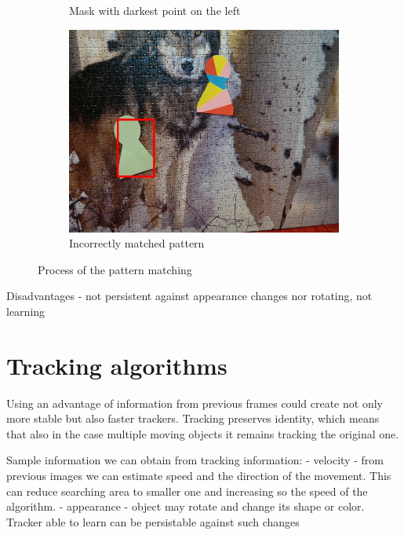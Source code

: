 \begin{figure}
\begin{subfigure}{0.48\linewidth}
    \caption{Mask with darkest point on the left}
  \end{subfigure}
  \begin{subfigure}{0.48\linewidth}
    \includegraphics[width=\linewidth]{img/pattern_matching/result-incorrect.jpg}
    \caption{Incorrectly matched pattern}
  \end{subfigure}
  \caption{Process of the pattern matching}
  \label{fig:pattern-matching-tracker}
\end{figure}


Disadvantages
- not persistent against appearance changes nor rotating, not learning


\section{Tracking algorithms}

Using an advantage of information from previous frames could create not only
more stable but also faster trackers. Tracking preserves identity, which means
that also in the case multiple moving objects it remains tracking the original
one.

Sample information we can obtain from tracking information:
- velocity - from previous images we can estimate speed and the direction of
  the movement. This can reduce searching area to smaller one and increasing so
  the speed of the algorithm.
- appearance - object may rotate and change its shape or color. Tracker able to
  learn can be persistable against such changes

